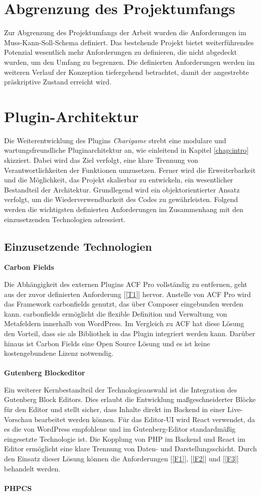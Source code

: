 \section{Abgrenzung des Projektumfangs}
Zur Abgrenzung des Projektumfangs der Arbeit wurden die Anforderungen im Muss-Kann-Soll-Schema definiert.
Das bestehende Projekt bietet weiterführendes Potenzial wesentlich mehr Anforderungen zu definieren, die nicht abgedeckt wurden, um den Umfang zu begrenzen.
Die definierten Anforderungen werden im weiteren Verlauf der Konzeption tiefergehend betrachtet, damit der angestrebte präskriptive Zustand erreicht wird.

\section{Plugin-Architektur}
Die Weiterentwicklung des Plugins \textit{Charigame} strebt eine modulare und wartungsfreundliche Pluginarchitektur an, wie einleitend in Kapitel \ref{chap:intro} skizziert.
Dabei wird das Ziel verfolgt, eine klare Trennung von Verantwortlichkeiten der Funktionen umzusetzen.
Ferner wird die Erweiterbarkeit und die Möglichkeit, das Projekt skalierbar zu entwickeln, ein wesentlicher Bestandteil der Architektur.
Grundlegend wird ein objektorientierter Ansatz verfolgt, um die Wiederverwendbarkeit des Codes zu gewährleisten.
Folgend werden die wichtigsten definierten Anforderungen im Zusammenhang mit den einzusetzenden Technologien adressiert.
\subsection{Einzusetzende Technologien}
\textbf{Carbon Fields}

Die Abhängigkeit des externen Plugins ACF Pro vollständig zu entfernen, geht aus der zuvor definierten Anforderung [\ref{T1}] hervor.
Anstelle von ACF Pro wird das Framework \gls{carbonfields} genutzt, das über Composer eingebunden werden kann.
\gls{carbonfields} ermöglicht die flexible Definition und Verwaltung von Metafeldern innerhalb von WordPress.
Im Vergleich zu ACF hat diese Lösung den Vorteil, dass sie als Bibliothek in das Plugin integriert werden kann.
Darüber hinaus ist Carbon Fields eine Open Source Lösung und es ist keine kostengebundene Lizenz notwendig.
\\\\
\textbf{Gutenberg Blockeditor}

Ein weiterer Kernbestandteil der Technologieauswahl ist die Integration des Gutenberg Block Editors.
Dies erlaubt die Entwicklung maßgeschneiderter Blöcke für den Editor und stellt sicher, dass Inhalte direkt im Backend in einer Live-Vorschau bearbeitet werden können.
Für das Editor-UI wird React verwendet, da es die von WordPress empfohlene und im Gutenberg-Editor standardmäßig eingesetzte Technologie ist.
Die Kopplung von PHP im Backend und React im Editor ermöglicht eine klare Trennung von Daten- und Darstellungsschicht.
Durch den Einsatz dieser Lösung können die Anforderungen [\ref{F1}], [\ref{F2}] und [\ref{F3}] behandelt werden.
\\\\
\textbf{PHPCS}

